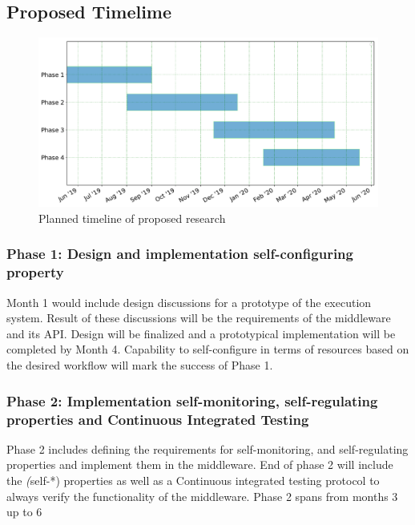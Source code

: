 

\subsection{Proposed Timelime}
\begin{figure}[t]
	\centering
	\includegraphics[width=.95\textwidth]{./phd_plan.pdf}
	\caption{Planned timeline of proposed research}\label{tab:work_plan}
\end{figure}

\subsubsection{Phase 1: Design and implementation self-configuring property}

Month 1 would include design discussions for a prototype of the execution system. 
Result of these discussions will be the requirements of the middleware and its 
API. Design will be finalized and a prototypical implementation will be completed 
by Month 4. Capability to self-configure in terms of resources based on the desired 
workflow will mark the success of Phase 1.

\subsubsection{Phase 2: Implementation self-monitoring, self-regulating properties
and Continuous Integrated Testing}
Phase 2 includes defining the requirements for self-monitoring, and self-regulating 
properties and implement them in the middleware. End of phase 2 will include the 
\textit(self-*) properties as well as a Continuous integrated testing protocol to 
always verify the functionality of the middleware. Phase 2 spans from months 3 up 
to 6

